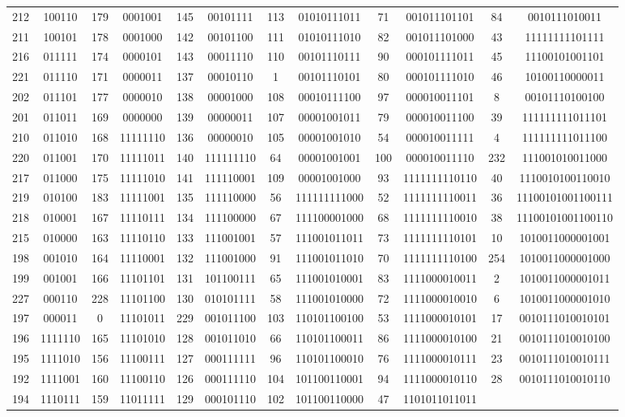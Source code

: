 \documentclass[conference,onecolumn,12pt]{IEEEtran}
\numberwithin{equation}{subsection}
\begin{document}
\begin{itemize}
\begin{table}[H]
\begin{tabular}{cccccccccccc}
212 & 100110 & 179 & 0001001 & 145 & 00101111 & 113 & 01010111011 & 71 & 001011101101 & 84 & 0010111010011 \\
211 & 100101 & 178 & 0001000 & 142 & 00101100 & 111 & 01010111010 & 82 & 001011101000 & 43 & 11111111101111 \\
216 & 011111 & 174 & 0000101 & 143 & 00011110 & 110 & 00101110111 & 90 & 000101111011 & 45 & 11100101001101 \\
221 & 011110 & 171 & 0000011 & 137 & 00010110 & 1 & 00101110101 & 80 & 000101111010 & 46 & 10100110000011 \\
202 & 011101 & 177 & 0000010 & 138 & 00001000 & 108 & 00010111100 & 97 & 000010011101 & 8 & 00101110100100 \\
201 & 011011 & 169 & 0000000 & 139 & 00000011 & 107 & 00001001011 & 79 & 000010011100 & 39 & 111111111011101 \\
210 & 011010 & 168 & 11111110 & 136 & 00000010 & 105 & 00001001010 & 54 & 000010011111 & 4 & 111111111011100 \\
220 & 011001 & 170 & 11111011 & 140 & 111111110 & 64 & 00001001001 & 100 & 000010011110 & 232 & 111001010011000 \\
217 & 011000 & 175 & 11111010 & 141 & 111110001 & 109 & 00001001000 & 93 & 1111111110110 & 40 & 1110010100110010 \\
219 & 010100 & 183 & 11111001 & 135 & 111110000 & 56 & 111111111000 & 52 & 1111111110011 & 36 & 11100101001100111 \\
218 & 010001 & 167 & 11110111 & 134 & 111100000 & 67 & 111100001000 & 68 & 1111111110010 & 38 & 11100101001100110 \\
215 & 010000 & 163 & 11110110 & 133 & 111001001 & 57 & 111001011011 & 73 & 1111111110101 & 10 & 1010011000001001 \\
198 & 001010 & 164 & 11110001 & 132 & 111001000 & 91 & 111001011010 & 70 & 1111111110100 & 254 & 1010011000001000 \\
199 & 001001 & 166 & 11101101 & 131 & 101100111 & 65 & 111001010001 & 83 & 1111000010011 & 2 & 1010011000001011 \\
227 & 000110 & 228 & 11101100 & 130 & 010101111 & 58 & 111001010000 & 72 & 1111000010010 & 6 & 1010011000001010 \\
197 & 000011 & 0 & 11101011 & 229 & 001011100 & 103 & 110101100100 & 53 & 1111000010101 & 17 & 0010111010010101 \\
196 & 1111110 & 165 & 11101010 & 128 & 001011010 & 66 & 110101100011 & 86 & 1111000010100 & 21 & 0010111010010100 \\
195 & 1111010 & 156 & 11100111 & 127 & 000111111 & 96 & 110101100010 & 76 & 1111000010111 & 23 & 0010111010010111 \\
192 & 1111001 & 160 & 11100110 & 126 & 000111110 & 104 & 101100110001 & 94 & 1111000010110 & 28 & 0010111010010110 \\
194 & 1110111 & 159 & 11011111 & 129 & 000101110 & 102 & 101100110000 & 47 & 1101011011011 \\
\bottomrule
\end{tabular}
\end{table}
    

\end{itemize}
\end{document}
